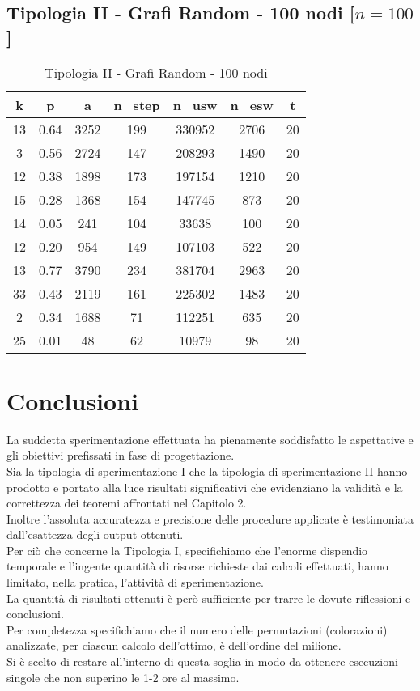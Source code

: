 \subsection{Tipologia II - Grafi Random - 100 nodi [$n=100$]}

\begin{table}[H]
\centering
\begin{tabular}{|c|c|c|c|c|c|c|}
\hline
\textbf{k} & \textbf{p} & \textbf{a} & \textbf{n\_step} & \textbf{n\_usw} & \textbf{n\_esw} & \textbf{t} \\ \hline
13 & 0.64 & 3252 & 199 & 330952 & 2706 & 20 \\ \hline
3 & 0.56 & 2724 & 147 & 208293 & 1490 & 20 \\ \hline
12 & 0.38 & 1898 & 173 & 197154 & 1210 & 20 \\ \hline
15 & 0.28 & 1368 & 154 & 147745 & 873 & 20 \\ \hline
14 & 0.05 & 241 & 104 & 33638 & 100 & 20 \\ \hline
12 & 0.20 & 954 & 149 & 107103 & 522 & 20 \\ \hline
13 & 0.77 & 3790 & 234 & 381704 & 2963 & 20 \\ \hline
33 & 0.43 & 2119 & 161 & 225302 & 1483 & 20 \\ \hline
2 & 0.34 & 1688 & 71 & 112251 & 635 & 20 \\ \hline
25 & 0.01 & 48 & 62 & 10979 & 98 & 20 \\ \hline
\end{tabular}
\caption{Tipologia II - Grafi Random - 100 nodi}
\label{tab:sperimentazione-tipo1-100nodi}
\end{table}

\section{Conclusioni}
\justify
La suddetta sperimentazione effettuata ha pienamente soddisfatto le aspettative e gli obiettivi prefissati in fase di progettazione.\\
Sia la tipologia di sperimentazione I che la tipologia di sperimentazione II hanno prodotto e portato alla luce risultati significativi che evidenziano la validità e la correttezza dei teoremi affrontati nel Capitolo 2.\\
Inoltre l'assoluta accuratezza e precisione delle procedure applicate è testimoniata dall'esattezza degli output ottenuti.\\

Per ciò che concerne la Tipologia I, specifichiamo che l'enorme dispendio temporale e l'ingente quantità di risorse richieste dai calcoli effettuati, hanno limitato, nella pratica, l'attività di sperimentazione.\\
La quantità di risultati ottenuti è però sufficiente per trarre le dovute riflessioni e conclusioni.\\
Per completezza specifichiamo che il numero delle permutazioni (colorazioni) analizzate, per ciascun calcolo dell'ottimo, è dell'ordine del milione.\\
Si è scelto di restare all'interno di questa soglia in modo da ottenere esecuzioni singole che non superino le 1-2 ore al massimo.\\

